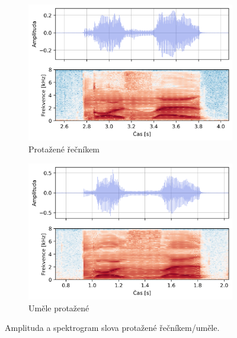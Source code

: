 \begin{figure}[htpb]
  \centering
  \begin{subfigure}[b]{0.42\textwidth}
    \includegraphics[width=\textwidth]{./ch6-realisation/img/energy_spec_word-kose_real.png}
    \caption{Protažené řečníkem}
    \label{fig:realisation:real:compare:real}
  \end{subfigure}
  \begin{subfigure}[b]{0.42\textwidth}
    \includegraphics[width=\textwidth]{./ch6-realisation/img/energy_spec_word-kose_augmented.png}
    \caption{Uměle protažené}
    \label{fig:realisation:real:compare:augmented}
  \end{subfigure}
  \caption{Amplituda a spektrogram slova  protažené řečníkem/uměle.}
  \label{fig:realisation:real:compare}
\end{figure}


